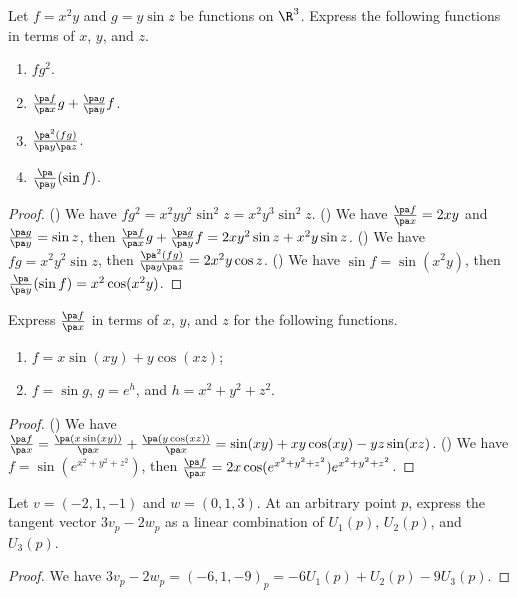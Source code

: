 \newpage
{}
\begin{exercise}[1.1.1]
    Let $f={x}^{2}y$ and $g=y\sin z$ be functions on ${\R}^{3}$. Express the following functions in terms of $x$, $y$, and $z$.
    \begin{enumerate}
        \item $f{g}^{2}$.
        \item $\frac{\pa f}{\pa x}g+\frac{\pa g}{\pa y}f$.
        \item $\frac{{\pa}^{2}(fg)}{\pa y\pa z}$.
        \item $\frac{\pa}{\pa y}(\sin f)$.
    \end{enumerate}
\end{exercise}
\begin{proof}
    () We have $f{g}^{2}={x}^{2}y{y}^{2}{\sin}^{2}z={x}^{2}{y}^{3}{\sin}^{2}z$. () We have $\frac{\pa f}{\pa x}=2xy$ and $\frac{\pa g}{\pa y}=\sin z$, then $\frac{\pa f}{\pa x}g+\frac{\pa g}{\pa y}f=2x{y}^{2}\sin z+{x}^{2}y\sin z$. () We have $fg={x}^{2}{y}^{2}\sin z$, then $\frac{{\pa}^{2}(fg)}{\pa y\pa z}=2{x}^{2}y\cos z$. () We have $\sin f=\sin({x}^{2}y)$, then $\frac{\pa}{\pa y}(\sin f)={x}^{2}\cos({x}^{2}y)$.
\end{proof}
\begin{exercise}[1.1.3]
    Express $\frac{\pa f}{\pa x}$ in terms of $x$, $y$, and $z$ for the following functions.
    \begin{enumerate}
        \item $f=x\sin(xy)+y\cos(xz)$;
        \item $f=\sin g$, $g={e}^{h}$, and $h={x}^{2}+{y}^{2}+{z}^{2}$.
    \end{enumerate}
\end{exercise}
\begin{proof}
    () We have $\frac{\pa f}{\pa x}=\frac{\pa(x\sin(xy))}{\pa x}+\frac{\pa(y\cos(xz))}{\pa x}=\sin(xy)+xy\cos(xy)-yz\sin(xz)$. () We have $f=\sin({e}^{{x}^{2}+{y}^{2}+{z}^{2}})$, then $\frac{\pa f}{\pa x}=2x\cos({e}^{{x}^{2}+{y}^{2}+{z}^{2}}){e}^{{x}^{2}+{y}^{2}+{z}^{2}}$.
\end{proof}
\begin{exercise}[1.2.1]
    Let $v=(-2,1,-1)$ and $w=(0,1,3)$. At an arbitrary point $p$, express the tangent vector $3{v}_{p}-2{w}_{p}$ as a linear combination of ${U}_{1}(p)$, ${U}_{2}(p)$, and ${U}_{3}(p)$.
\end{exercise}
\begin{proof}
    We have $3{v}_{p}-2{w}_{p}={(-6,1,-9)}_{p}=-6{U}_{1}(p)+{U}_{2}(p)-9{U}_{3}(p)$.
\end{proof}

